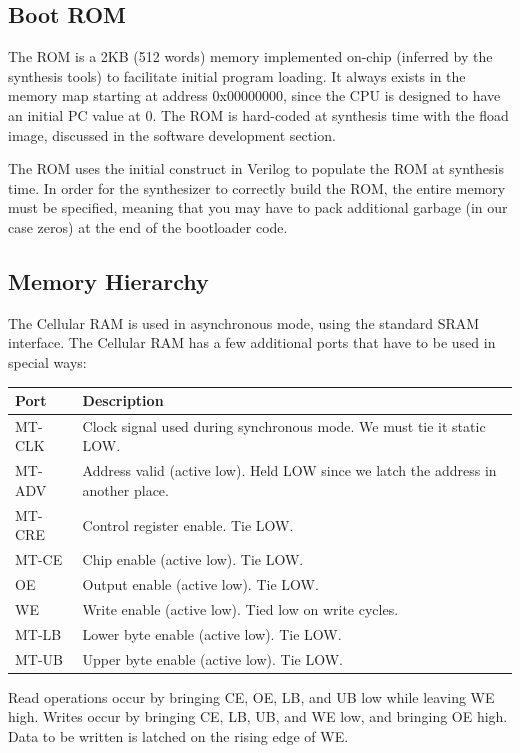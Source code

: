 \documentclass{article}
\begin{document}
\subsection{Boot ROM}
The ROM is a 2KB (512 words) memory implemented on-chip (inferred by the synthesis tools) to facilitate initial program loading. It always exists in the memory map starting at address 0x00000000, since the CPU is designed to have an initial PC value at 0. The ROM is hard-coded at synthesis time with the fload image, discussed in the software development section.

The ROM uses the initial construct in Verilog to populate the ROM at synthesis time. In order for the synthesizer to correctly build the ROM, the entire memory must be specified, meaning that you may have to pack additional garbage (in our case zeros) at the end of the bootloader code.

\subsection{Memory Hierarchy}

The Cellular RAM is used in asynchronous mode, using the standard SRAM interface. The Cellular RAM has a few additional ports that have to be used in special ways:

\begin{tabular}{|l|l|}
 \hline
 
 \textbf{Port}&   \textbf{Description} 								\\ \hline
 MT-CLK       & Clock signal used during synchronous mode. We must tie it static LOW.\\ \hline
 MT-ADV	      & Address valid (active low). Held LOW since we latch the address in another place. \\ \hline
 MT-CRE       & Control register enable. Tie LOW. \\ \hline
 MT-CE        & Chip enable (active low). Tie LOW.\\ \hline
 OE           & Output enable (active low). Tie LOW.\\ \hline
 WE           & Write enable (active low). Tied low on write cycles.\\ \hline
 MT-LB        & Lower byte enable (active low). Tie LOW.\\ \hline
 MT-UB        & Upper byte enable (active low). Tie LOW.\\ \hline
\end{tabular}

Read operations occur by bringing CE, OE, LB, and UB low while leaving WE high. Writes occur by bringing CE, LB, UB, and WE low, and bringing OE high. Data to be written is latched on the rising edge of WE.
\end{document}

